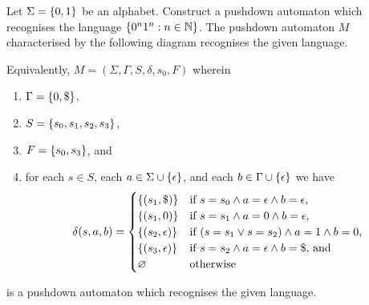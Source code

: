 \Bxr
    Let \(\Sigma = \{0, 1\}\) be an alphabet. Construct a pushdown automaton
    which recognises the language \(\{0^n 1^n : n \in \mathbb{N}\}\).
\Exr
\Bsl
    The pushdown automaton \(M\) characterised by the following diagram
    recognises the given language.
    \begin{figure}[!h]
        \centering
    \end{figure}

    \noindent Equivalently, \(M = (\Sigma, \Gamma, S, \delta, s_0, F)\)
    wherein
    \begin{enumerate}
        \item \(\Gamma = \{0, \$\}\),
        \item \(S = \{s_0, s_1, s_2, s_3\}\),
        \item \(F = \{s_0, s_3\}\), and
        \item for each \(s \in S\), each \(a \in \Sigma \cup
            \{\epsilon\}\), and each \(b \in \Gamma \cup
            \{\epsilon\}\) we have
            \[
                \delta(s, a, b) = \begin{cases}
                    \{(s_1, \$)\} & \text{if } s = s_0 \land a = \epsilon
                    \land b = \epsilon,\\
                    \{(s_1, 0)\} & \text{if } s = s_1 \land a = 0 \land b =
                    \epsilon,\\
                    \{(s_2, \epsilon)\} & \text{if } (s = s_1 \lor s = s_2)
                    \land a = 1 \land b = 0,\\
                    \{(s_3, \epsilon)\} & \text{if } s = s_2 \land a =
                    \epsilon \land b = \$ \text{, and}\\
                    \varnothing & \text{otherwise}
                \end{cases}
            \]
    \end{enumerate}
    is a pushdown automaton which recognises the given language.
\Esl

